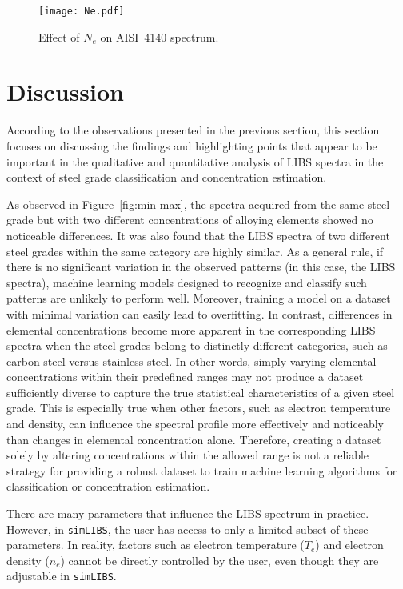 \documentclass[12pt,a4paper]{article}
\begin{document}
	
	\begin{figure}[h!]
		\centering
		\texttt{[image: Ne.pdf]}
		\caption{Effect of $N_e$ on AISI~4140 spectrum.}
		\label{fig:Effect of N_e}
	\end{figure}

	
	\section{Discussion}
	According to the observations presented in the previous section, this section focuses on discussing the findings and highlighting points that appear to be important in the qualitative and quantitative analysis of LIBS spectra in the context of steel grade classification and concentration estimation.
	
	As observed in Figure~\ref{fig:min-max}, the spectra acquired from the same steel grade but with two different concentrations of alloying elements showed no noticeable differences. It was also found that the LIBS spectra of two different steel grades within the same category are highly similar. As a general rule, if there is no significant variation in the observed patterns (in this case, the LIBS spectra), machine learning models designed to recognize and classify such patterns are unlikely to perform well. Moreover, training a model on a dataset with minimal variation can easily lead to overfitting. In contrast, differences in elemental concentrations become more apparent in the corresponding LIBS spectra when the steel grades belong to distinctly different categories, such as carbon steel versus stainless steel. In other words, simply varying elemental concentrations within their predefined ranges may not produce a dataset sufficiently diverse to capture the true statistical characteristics of a given steel grade. This is especially true when other factors, such as electron temperature and density, can influence the spectral profile more effectively and noticeably than changes in elemental concentration alone. Therefore, creating a dataset solely by altering concentrations within the allowed range is not a reliable strategy for providing a robust dataset to train machine learning algorithms for classification or concentration estimation.
	
	
	There are many parameters that influence the LIBS spectrum in practice. However, in \texttt{simLIBS}, the user has access to only a limited subset of these parameters. In reality, factors such as electron temperature ($T_e$) and electron density ($n_e$) cannot be directly controlled by the user, even though they are adjustable in \texttt{simLIBS}.
	  
\end{document}
